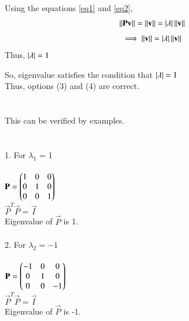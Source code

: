 \documentclass[journal]{IEEEtran}
\begin{document}
Using the equations \eqref{eq1} and \eqref{eq2},
\begin{align}
\left\lVert\mathbf{P}\mathbf{v}\right\rVert = \left\lVert\mathbf{v}\right\rVert = \left\vert\lambda\right\vert\left\lVert\mathbf{v}\right\rVert
\end{align}
\begin{align}
\implies \left\lVert\mathbf{v}\right\rVert = \left\vert\lambda\right\vert\left\lVert\mathbf{v}\right\rVert
\end{align}
Thus, $\left\vert\lambda\right\vert = 1$

So, eigenvalue satisfies the condition that $\left\vert\lambda\right\vert=1$\\

Thus, options (3) and (4) are correct. \\ \\ \\

This can be verified by examples.\\ \\ \\
1. For $\lambda_1$ = 1 \\ \\
$\mathbf{P} = \begin{pmatrix}1 & 0 & 0 \\ 0 & 1 & 0 \\ 0 & 0 & 1\end{pmatrix}$ \\
$\vec{P}^T\vec{P} = \vec{I}$ \\
Eigenvalue of $\vec{P}$ is 1. \\ \\

2. For $\lambda_2 = -1$ \\ \\
$\mathbf{P} = \begin{pmatrix}-1 & 0 & 0 \\ 0 & 1 & 0 \\ 0 & 0 & -1\end{pmatrix}$ \\
$\vec{P}^T\vec{P} = \vec{I}$ \\
Eigenvalue of $\vec{P}$ is -1. \\ \\
\end{document}
